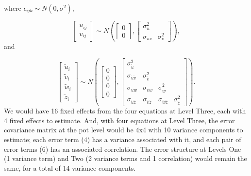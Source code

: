 \documentclass[
]{krantz}
\begin{document}
where \(\epsilon_{ijk}\sim N(0,\sigma^2)\),

\[ \left[ \begin{array}{c}
            u_{ij} \\ v_{ij}
          \end{array}  \right] \sim N \left( \left[
          \begin{array}{c}
            0 \\ 0
          \end{array} \right], \left[
          \begin{array}{cc}
            \sigma_{u}^{2} & \\
            \sigma_{uv} & \sigma_{v}^{2}
          \end{array} \right] \right), \] and

\[ \left[ \begin{array}{c}
            \tilde{u}_{i} \\ \tilde{v}_{i} \\ \tilde{w}_{i} \\ \tilde{z}_{i}
          \end{array}  \right] \sim N \left( \left[
          \begin{array}{c}
            0 \\ 0 \\ 0 \\ 0
          \end{array} \right], \left[
          \begin{array}{cccc}
            \sigma_{\tilde{u}}^{2} & & & \\
            \sigma_{\tilde{u}\tilde{v}} & \sigma_{\tilde{v}}^{2} & & \\
            \sigma_{\tilde{u}\tilde{w}} & \sigma_{\tilde{v}\tilde{w}} & \sigma_{\tilde{w}}^{2} & \\
            \sigma_{\tilde{u}\tilde{z}} & \sigma_{\tilde{v}\tilde{z}} & \sigma_{\tilde{w}\tilde{z}} & \sigma_{\tilde{z}}^{2}
          \end{array} \right] \right). \]
We would have 16 fixed effects from the four equations at Level Three, each with 4 fixed effects to estimate. And, with four equations at Level Three, the error covariance matrix at the pot level would be 4x4 with 10 variance components to estimate; each error term (4) has a variance associated with it, and each pair of error terms (6) has an associated correlation. The error structure at Levels One (1 variance term) and Two (2 variance terms and 1 correlation) would remain the same, for a total of 14 variance components.
\end{document}
